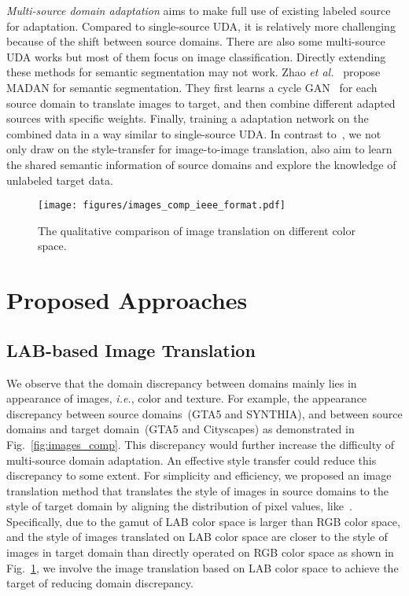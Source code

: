\documentclass[final]{cvpr}
\def\etal{\textit{et al.}}
\def\ie{\textit{i.e.}}
\begin{document}
\textit{Multi-source domain adaptation} aims to make full use of existing labeled source for adaptation. Compared to single-source UDA, it is relatively more challenging because of the shift between source domains. There are also some multi-source UDA works but most of them focus on image classification. Directly extending these methods for semantic segmentation may not work. Zhao \etal~\cite{zhao2019multi} propose MADAN for semantic segmentation. They first learns a cycle GAN~\cite{zhu2017unpaired} for each source domain to translate images to target, and then combine different adapted sources with specific weights. Finally, training a adaptation network on the combined data in a way similar to single-source UDA. In contrast to~\cite{zhao2019multi}, we not only draw on the style-transfer for image-to-image translation, also aim to learn the shared semantic information of source domains and explore the knowledge of unlabeled target data. 


\begin{figure}[t]
	\begin{center}
\texttt{[image: figures/images\_comp\_ieee\_format.pdf]}
	\end{center}
	\vspace{-4mm}
	\caption{The qualitative comparison of image translation on different color space.}
	\label{fig:trans_comp}
	\vspace{-5mm}
\end{figure}
\section{Proposed Approaches}
\subsection{LAB-based Image Translation}
\label{sec:lab}
We observe that the domain discrepancy between domains mainly lies in appearance of images, \ie, color and texture. For example, the appearance discrepancy between source domains~(GTA5 and SYNTHIA), and between source domains and target domain~(GTA5 and Cityscapes) as demonstrated in Fig.~\ref{fig:images_comp}. This discrepancy would further increase the difficulty of multi-source domain adaptation. An effective style transfer could reduce this discrepancy to some extent. For simplicity and efficiency, we proposed an image translation method that translates the style of images in source domains to the style of target domain by aligning the distribution of pixel values, like~\cite{reinhard2001color}. Specifically, due to the gamut of LAB color space is larger than RGB color space, and the style of images translated on LAB color space are closer to the style of images in target domain than directly operated on RGB color space as shown in Fig.~\ref{fig:trans_comp}, we involve the image translation based on LAB color space to achieve the target of reducing domain discrepancy. 
\end{document}
